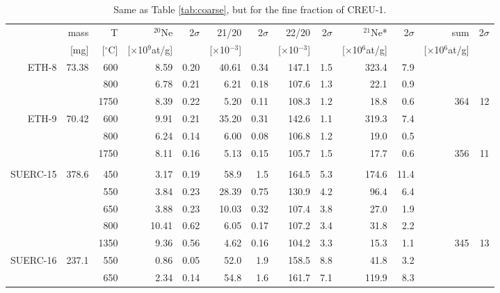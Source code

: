 \documentclass[authoryear,review,12pt]{elsarticle}
\begin{document}
\begin{table}
\caption{Same as Table \ref{tab:coarse}, but for the fine fraction of CREU-1.} \label{tab:fine}
    \begin{tabular}{|r|rrrrrrrrrrrr|}
\hline
          & mass  & T     & $^{20}$Ne  & 2$\sigma$    & 21/20 & 2$\sigma$    & 22/20 & 2$\sigma$    & $^{21}$Ne* & 
2$\sigma$    & sum   & 2$\sigma$ \\ 
          & [mg]    & [$^\circ$C]   & [$\times$10$^9$at/g] & & [$\times$10$^{-3}$] & 
 & [$\times$10$^{-3}$] & & [$\times$10$^6$at/g] & & 
[$\times$10$^6$at/g] & \\ \hline

    ETH-8 & 73.38 & 600   & 8.59  & 0.20  & 40.61 & 0.34  & 147.1 & 1.5   & 323.4 & 7.9   &       &  \\
    \hline
          &       & 800   & 6.78  & 0.21  & 6.21  & 0.18  & 107.6 & 1.3   & 22.1  & 0.9   &       &  \\
          &       & 1750  & 8.39  & 0.22  & 5.20  & 0.11  & 108.3 & 1.2   & 18.8  & 0.6   & 364   & 12 \\
    ETH-9 & 70.42 & 600   & 9.91  & 0.21  & 35.20 & 0.31  & 142.6 & 1.1   & 319.3 & 7.4   &       &  \\
          &       & 800   & 6.24  & 0.14  & 6.00  & 0.08  & 106.8 & 1.2   & 19.0  & 0.5   &       &  \\
          &       & 1750  & 8.11  & 0.16  & 5.13  & 0.15  & 105.7 & 1.5   & 17.7  & 0.6   & 356   & 11 \\
          &       &       &       &       &       &       &       &       &       &       &       &  \\
    SUERC-15 & 378.6 & 450   & 3.17  & 0.19  & 58.9  & 1.5   & 164.5 & 5.3   & 174.6 & 11.4  &       &  \\
          &       & 550   & 3.84  & 0.23  & 28.39 & 0.75  & 130.9 & 4.2   & 96.4  & 6.4   &       &  \\
          &       & 650   & 3.88  & 0.23  & 10.03 & 0.32  & 107.4 & 3.8   & 27.0  & 1.9   &       &  \\
          &       & 800   & 10.41 & 0.62  & 6.05  & 0.17  & 107.2 & 3.4   & 31.8  & 2.2   &       &  \\
          &       & 1350  & 9.36  & 0.56  & 4.62  & 0.16  & 104.2 & 3.3   & 15.3  & 1.1   & 345   & 13 \\
    SUERC-16 & 237.1 & 550   & 0.86  & 0.05  & 52.0  & 1.9   & 158.5 & 8.8   & 41.8  & 3.2   &       &  \\
          &       & 650   & 2.34  & 0.14  & 54.8  & 1.6   & 161.7 & 7.1   & 119.9 & 8.3   &       &  \\

\end{tabular}
\end{table}
\end{document}
